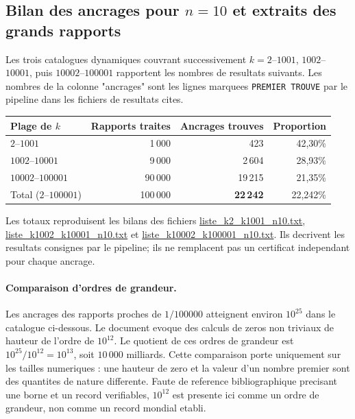 \documentclass[11pt,a4paper]{article}
\begin{document}
\subsection{Bilan des ancrages pour $n=10$ et extraits des grands rapports}

Les trois catalogues dynamiques couvrant successivement $k=2$--$1001$, $1002$--
$10001$, puis $10002$--$100001$ rapportent les nombres de resultats suivants.
Les nombres de la colonne "ancrages" sont les lignes marquees \texttt{PREMIER TROUVE}
par le pipeline dans les fichiers de resultats cites.

\begin{center}\small
\begin{tabular}{@{}l r r r@{}}
\toprule
\rowcolor{spectralgris}
Plage de $k$ & Rapports traites & Ancrages trouves & Proportion \\
\midrule
$2$--$1001$ & 1\,000 & 423 & 42,30\% \\
$1002$--$10001$ & 9\,000 & 2\,604 & 28,93\% \\
$10002$--$100001$ & 90\,000 & 19\,215 & 21,35\% \\
\midrule
\rowcolor{spectralazur!8}
Total ($2$--$100001$) & 100\,000 & \textbf{22\,242} & 22,242\% \\
\bottomrule
\end{tabular}
\end{center}

Les totaux reproduisent les bilans des fichiers \url{liste_k2_k1001_n10.txt},
\url{liste_k1002_k10001_n10.txt} et
\url{liste_k10002_k100001_n10.txt}. Ils decrivent les resultats consignes par
le pipeline; ils ne remplacent pas un certificat independant pour chaque ancrage.

\paragraph{Comparaison d'ordres de grandeur.}
Les ancrages des rapports proches de $1/100000$ atteignent environ $10^{25}$ dans le
catalogue ci-dessous. Le document evoque des calculs de zeros non triviaux de hauteur
de l'ordre de $10^{12}$. Le quotient de ces ordres de grandeur est
$10^{25}/10^{12}=10^{13}$, soit $10\,000$ milliards. Cette comparaison porte uniquement
sur les tailles numeriques : une hauteur de zero et la valeur d'un nombre premier sont
des quantites de nature differente. Faute de reference bibliographique precisant une
borne et un record verifiables, $10^{12}$ est presente ici comme un ordre de grandeur,
non comme un record mondial etabli.
\end{document}
